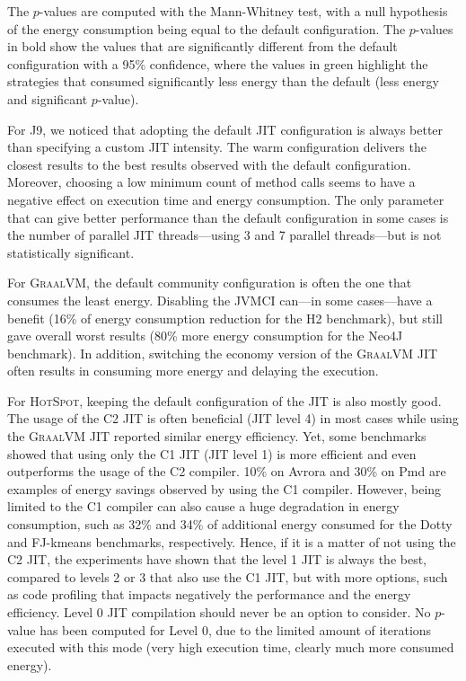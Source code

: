 The $p$-values are computed with the Mann-Whitney test, with a null hypothesis of the energy consumption being equal to the default configuration.
The $p$-values in bold show the values that are significantly different from the default configuration with a 95\% confidence, where the values in green highlight the strategies that consumed significantly less energy than the default (less energy and significant $p$-value).



For \textsc{J9}, we noticed that adopting the default JIT configuration is always better than specifying a custom JIT intensity.
The \textsf{warm} configuration delivers the closest results to the best results observed with the default configuration.
Moreover, choosing a low minimum count of method calls seems to have a negative effect on execution time and energy consumption.
The only parameter that can give better performance than the default configuration in some cases is the number of parallel JIT threads---using 3 and 7 parallel threads---but is not statistically significant.

For \textsc{GraalVM}, the default community configuration is often the one that consumes the least energy.
Disabling the JVMCI can---in some cases---have a benefit (16\% of energy consumption reduction for the \textsf{H2} benchmark), but still gave overall worst results (80\% more energy consumption for the \textsf{Neo4J} benchmark).
In addition, switching the economy version of the \textsc{GraalVM} JIT often results in consuming more energy and delaying the execution.

For \textsc{HotSpot}, keeping the default configuration of the JIT is also mostly good.
The usage of the C2 JIT is often beneficial (JIT level 4) in most cases while using the \textsc{GraalVM} JIT reported similar energy efficiency.
Yet, some benchmarks showed that using only the C1 JIT (JIT level 1) is more efficient and even outperforms the usage of the C2 compiler.
10\% on \textsf{Avrora} and 30\% on \textsf{Pmd} are examples of energy savings observed by using the C1 compiler.
However, being limited to the C1 compiler can also cause a huge degradation in energy consumption, such as 32\% and 34\% of additional energy consumed for the \textsf{Dotty} and \textsf{FJ-kmeans} benchmarks, respectively.
Hence, if it is a matter of not using the C2 JIT, the experiments have shown that the level 1 JIT is always the best, compared to levels 2 or 3 that also use the C1 JIT, but with more options, such as code profiling that impacts negatively the performance and the energy efficiency.
Level 0 JIT compilation should never be an option to consider.
No $p$-value has been computed for Level 0, due to the limited amount of iterations executed with this mode (very high execution time, clearly much more consumed energy).

